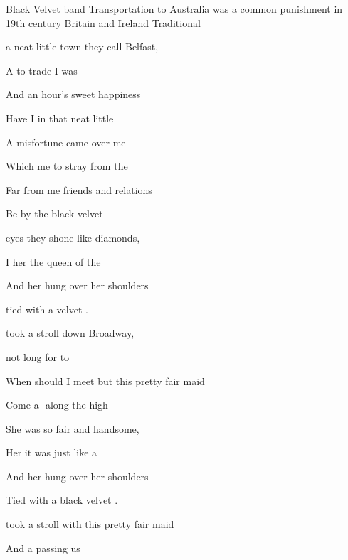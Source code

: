 \begin{SBSong}{Black Velvet band}
  {Transportation to Australia was a common punishment in 19th century Britain and Ireland}
  {Traditional}
  \begin{SBVerse}
     a neat little town they call Belfast, 
    
    A to trade I was 

    And  an hour's sweet happiness 
    
    Have I  in that neat little 

    A  misfortune came over me
    
    Which  me to stray from the 

    Far  from me friends and relations

    Be by the black velvet 
  \end{SBVerse}
  \begin{SBChorus}
     eyes they shone like diamonds, 
    
    I  her the queen of the 

    And her  hung over her shoulders  
    
    tied  with a  velvet .
  \end{SBChorus}
  \begin{SBVerse}
     took a stroll down Broadway, 
    
     not long for to 

    When  should I meet but this pretty fair maid 
    
    Come a- along the high

    She was so fair and handsome, 
    
    Her  it was just like a 
           
    And her  hung over her shoulders
    
    Tied  with a black velvet .
  \end{SBVerse}
  \CBPageBrk
  \begin{SBVerse}
     took a stroll with this pretty fair maid
    
    And a  passing us 


\end{SBVerse}
\end{SBSong}
